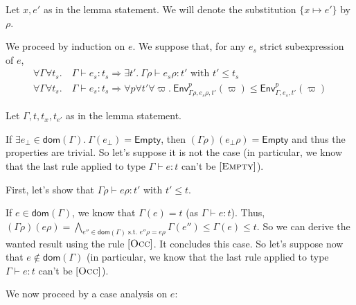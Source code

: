 \documentclass[a4paper]{article}%
\newcommand{\dom}[1]{\textsf{dom}(#1)}
\newcommand{\Empty} {\textsf{Empty}}%
\newcommand{\subst}[2]{\{#1 \mapsto #2\}}
\newcommand{\Gp}[2]{\textsf{Env}^{#1}_{#2}}
\theoremstyle{definition}
\newcommand {\Rule}[1] {[\textsc{#1}]}
\begin{document}
    Let $x,e'$ as in the lemma statement. We will denote the substitution $\subst x {e'}$ by $\rho$.

    We proceed by induction on $e$. We suppose that, for any $e_s$ strict subexpression of $e$,
    \begin{align*}
      \forall \Gamma \forall t_s.\ &\Gamma \vdash e_s:t_s \Rightarrow \exists t'.\ \Gamma \rho \vdash e_s \rho:t' \text{ with } t'\leq t_s\\
      \forall \Gamma \forall t_s.\ &\Gamma \vdash e_s:t_s \Rightarrow \forall p \forall t' \forall \varpi.\ \Gp p {\Gamma\rho,e_s\rho,t'} (\varpi) \leq \Gp p {\Gamma,e_s,t'} (\varpi)
    \end{align*}

    Let $\Gamma,t,t_x,t_{e'}$ as in the lemma statement.

    If $\exists e_\bot \in \dom {\Gamma}.\ \Gamma(e_\bot) = \Empty$, then $(\Gamma\rho)(e_\bot\rho) = \Empty$ and thus the properties are trivial.
    So let's suppose it is not the case (in particular, we know that the last rule applied to type $\Gamma \vdash e:t$ can't be $\Rule{Empty}$).

    First, let's show that $\Gamma \rho \vdash e \rho:t'$ with $t'\leq t$.

    If $e\in\dom\Gamma$, we know that $\Gamma(e)=t$ (as $\Gamma \vdash e:t$). Thus, $(\Gamma\rho)(e\rho)=\bigwedge_{e'' \in \dom \Gamma \text{ s.t. } e''\rho=e\rho} \Gamma(e'') \leq \Gamma(e) \leq t$.
    So we can derive the wanted result using the rule $\Rule {Occ}$. It concludes this case. So let's suppose now that $e\not\in\dom\Gamma$ (in particular, we know that the last rule applied to type $\Gamma \vdash e:t$ can't be $\Rule{Occ}$).
    
    We now proceed by a case analysis on $e$:
    
\end{document}
